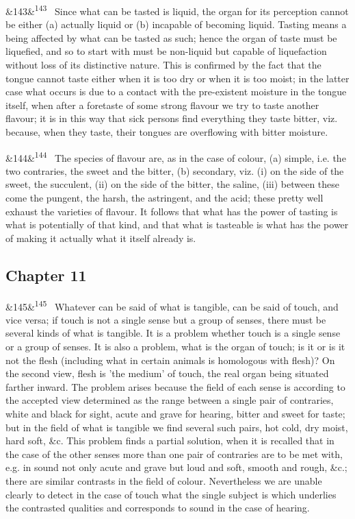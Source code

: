 \documentclass[12pt]{article}
\newcommand{\para}[1][]{\par\noindent\ifx&#1&\else\textsuperscript{\footnotesize #1}~\fi}
\begin{document}
\para[143] Since what can be tasted is liquid, the organ for its perception cannot be either (a) actually liquid or (b) incapable of becoming liquid. Tasting means a being affected by what can be tasted as such; hence the organ of taste must be liquefied, and so to start with must be non-liquid but capable of liquefaction without loss of its distinctive nature. This is confirmed by the fact that the tongue cannot taste either when it is too dry or when it is too moist; in the latter case what occurs is due to a contact with the pre-existent moisture in the tongue itself, when after a foretaste of some strong flavour we try to taste another flavour; it is in this way that sick persons find everything they taste bitter, viz. because, when they taste, their tongues are overflowing with bitter moisture.

\para[144] The species of flavour are, as in the case of colour, (a) simple, i.e. the two contraries, the sweet and the bitter, (b) secondary, viz. (i) on the side of the sweet, the succulent, (ii) on the side of the bitter, the saline, (iii) between these come the pungent, the harsh, the astringent, and the acid; these pretty well exhaust the varieties of flavour. It follows that what has the power of tasting is what is potentially of that kind, and that what is tasteable is what has the power of making it actually what it itself already is.

\subsection*{Chapter 11}

\para[145] Whatever can be said of what is tangible, can be said of touch, and vice versa; if touch is not a single sense but a group of senses, there must be several kinds of what is tangible. It is a problem whether touch is a single sense or a group of senses. It is also a problem, what is the organ of touch; is it or is it not the flesh (including what in certain animals is homologous with flesh)? On the second view, flesh is 'the medium' of touch, the real organ being situated farther inward. The problem arises because the field of each sense is according to the accepted view determined as the range between a single pair of contraries, white and black for sight, acute and grave for hearing, bitter and sweet for taste; but in the field of what is tangible we find several such pairs, hot cold, dry moist, hard soft, \&c. This problem finds a partial solution, when it is recalled that in the case of the other senses more than one pair of contraries are to be met with, e.g. in sound not only acute and grave but loud and soft, smooth and rough, \&c.; there are similar contrasts in the field of colour. Nevertheless we are unable clearly to detect in the case of touch what the single subject is which underlies the contrasted qualities and corresponds to sound in the case of hearing.
\end{document}
